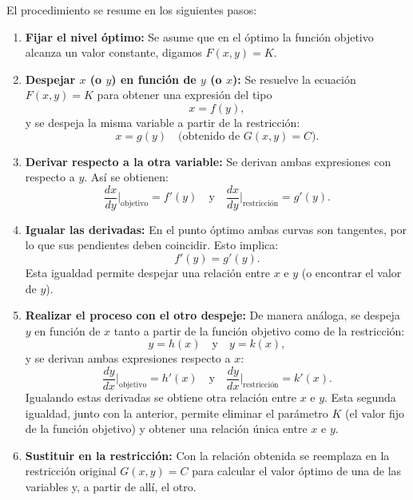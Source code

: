 \documentclass{article}
\begin{document}
El procedimiento se resume en los siguientes pasos:
\begin{enumerate}
    \item \textbf{\color{teal}Fijar el nivel óptimo:}  
    Se asume que en el óptimo la función objetivo alcanza un valor constante, digamos \(F(x,y)=K\).  

    \item \textbf{\color{teal}Despejar \(x\) (o \(y\)) en función de \(y\) (o \(x\)):}  
    Se resuelve la ecuación \(F(x,y)=K\) para obtener una expresión del tipo
    \[
    x = f(y),
    \]
    y se despeja la misma variable a partir de la restricción:
    \[
    x = g(y) \quad \text{(obtenido de } G(x,y)=C\text{)}.
    \]
    
    \item \textbf{\color{teal}Derivar respecto a la otra variable:}  
    Se derivan ambas expresiones con respecto a \(y\). Así se obtienen:
    \[
    \frac{dx}{dy}\Big|_{\text{objetivo}} = f'(y) \quad \text{y} \quad \frac{dx}{dy}\Big|_{\text{restricción}} = g'(y).
    \]
    
    \item \textbf{\color{teal}Igualar las derivadas:}  
    En el punto óptimo ambas curvas son tangentes, por lo que sus pendientes deben coincidir. Esto implica:
    \[
    f'(y)=g'(y).
    \]
    Esta igualdad permite despejar una relación entre \(x\) e \(y\) (o encontrar el valor de \(y\)).
    
    \item \textbf{\color{teal}Realizar el proceso con el otro despeje:}  
    De manera análoga, se despeja \(y\) en función de \(x\) tanto a partir de la función objetivo como de la restricción:
    \[
    y = h(x) \quad \text{y} \quad y = k(x),
    \]
    y se derivan ambas expresiones respecto a \(x\):
    \[
    \frac{dy}{dx}\Big|_{\text{objetivo}} = h'(x) \quad \text{y} \quad \frac{dy}{dx}\Big|_{\text{restricción}} = k'(x).
    \]
    Igualando estas derivadas se obtiene otra relación entre \(x\) e \(y\). Esta segunda igualdad, junto con la anterior, permite eliminar el parámetro \(K\) (el valor fijo de la función objetivo) y obtener una relación única entre \(x\) e \(y\).

    \item \textbf{\color{teal}Sustituir en la restricción:}  
    Con la relación obtenida se reemplaza en la restricción original \(G(x,y)=C\) para calcular el valor óptimo de una de las variables y, a partir de allí, el otro.
\end{enumerate}
\end{document}
